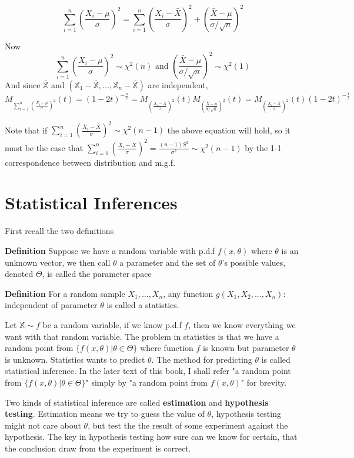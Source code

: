 \documentclass[a4paper,12pt]{article}
\begin{document}
$$\sum_{i=1}^n (\frac{X_i-\mu}{\sigma})^2 = \sum_{i=1}^n (\frac{X_i-\bar{X}}{\sigma})^2 + (\frac{\bar{X}-\mu}{\sigma/\sqrt{n}})^2$$

Now
$$\sum_{i=1}^n (\frac{X_i-\mu}{\sigma})^2 \sim \chi^2(n) \text{ and } (\frac{\bar{X}-\mu}{\sigma/\sqrt{n}})^2 \sim \chi^2(1)$$
And since $\bar{\mathbb{X}}$ and $(\mathbb{X}_1-\bar{\mathbb{X}}, ..., \mathbb{X}_n-\bar{\mathbb{X}})$ are independent,
$$M_{\sum_{i=1}^n (\frac{X_i-\mu}{\sigma})^2}(t) = (1-2t)^{-\frac{n}{2}} = M_{(\frac{X_i-\bar{X}}{\sigma})^2}(t)M_{(\frac{\bar{X}-\mu}{\sigma/\sqrt{n}})^2}(t) = M_{(\frac{X_i-\bar{X}}{\sigma})^2}(t)(1-2t)^{-\frac{1}{2}}$$

Note that if $\sum_{i=1}^n(\frac{X_i-\bar{X}}{\sigma})^2 \sim \chi^2(n-1)$ the above equation will hold, so it must be the case that $\sum_{i=1}^n(\frac{X_i-\bar{X}}{\sigma})^2 = \frac{(n-1)S^2}{\sigma^2} \sim \chi^2(n-1)$ by the 1-1 correspondence between distribution and m.g.f.

\newpage
\section{Statistical Inferences}

First recall the two definitions 

\textbf{Definition}
Suppose we have a random variable with p.d.f $f(x, \theta)$ where $\theta$ is an unknown vector, we then call $\theta$ a parameter and the set of $\theta$'s possible values, denoted $\Theta$, is called the parameter space 

\textbf{Definition}
For a random sample $X_1, ..., X_n$, any function $g(X_1, X_2, ..., X_n): $ independent of parameter $\theta$ is called a statistics. 

Let $\mathbb{X} \sim f$ be a random variable, if we know p.d.f $f$, then we know everything we want with that random variable. The problem in statistics is that we have a random point from $\{ f(x, \theta) | \theta\in\Theta \}$ where function $f$ is known but parameter $\theta$ is unknown. Statistics wants to predict $\theta$. The method for predicting $\theta$ is called statistical inference. In the later text of this book, I shall refer "a random point from $\{ f(x, \theta) | \theta\in\Theta \}$" simply by "a random point from $f(x, \theta)$" for brevity. 

Two kinds of statistical inference are called \textbf{estimation} and \textbf{hypothesis testing}. Estimation means we try to guess the value of $\theta$, hypothesis testing might not care about $\theta$, but test the the result of some experiment against the hypothesis. The key in hypothesis testing how sure can we know for certain, that the conclusion draw from the experiment is correct. 
\end{document}

